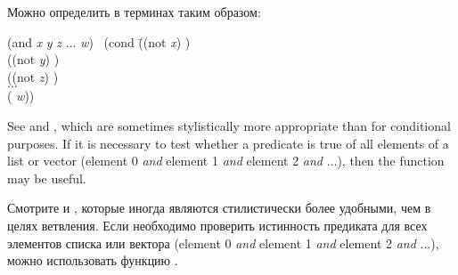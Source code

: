 \begin{defmac}
Можно определить  в терминах  таким образом:
\begin{lisp}
(and \emph{x} \emph{y} \emph{z} ... \emph{w}) \EQ\ (cond \=((not \emph{x}) {\false}) \\
\>((not \emph{y}) {\false}) \\
\>((not \emph{z}) {\false}) \\
\>$\ldots$ \\
\>({\true} \emph{w}))
\end{lisp}

See  and , which are sometimes stylistically
more appropriate than  for conditional purposes.
If it is necessary to test whether a predicate is true
of all elements of a list or vector (element 0 \emph{and} element 1 \emph{and}
element 2 \emph{and} $\ldots$), then the function  may be useful.

Смотрите  и , которые иногда являются стилистически более
удобными, чем  в целях ветвления.
Если необходимо проверить истинность предиката для всех элементов списка или
вектора (element 0 \emph{and} element 1 \emph{and}
element 2 \emph{and} $\ldots$), можно использовать функцию .
\end{defmac}

